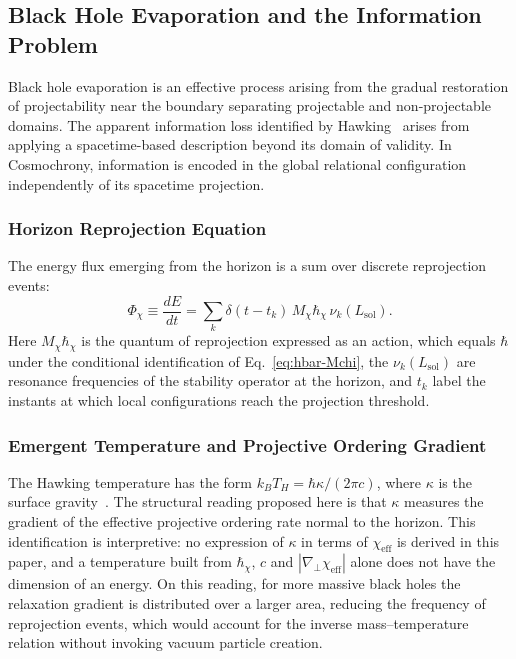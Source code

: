 \subsection{Black Hole Evaporation and the Information Problem}
  \label{subsec:black-hole-evaporation-information}

  Black hole evaporation is an effective process arising from the gradual
  restoration of projectability near the boundary separating projectable and
  non-projectable domains.
  The apparent information loss identified by
  Hawking~\cite{Hawking1976} arises from applying a spacetime-based
  description beyond its domain of validity.
  In Cosmochrony, information is encoded in the global relational
  configuration independently of its spacetime projection.

  \subsubsection*{Horizon Reprojection Equation}
    \label{subsec:horizon-reprojection-equation}

    The energy flux emerging from the horizon is a sum over discrete
    reprojection events:
    \[
      \Phi_\chi \equiv \frac{dE}{dt}
      = \sum_k \delta(t - t_k)\,
      M_\chi\hbar_\chi\, \nu_k(L_{\mathrm{sol}}).
    \]
    Here $M_\chi\hbar_\chi$ is the quantum of reprojection expressed as an action, which equals $\hbar$ under the
    conditional identification of Eq.~\eqref{eq:hbar-Mchi}, the
    $\nu_k(L_{\mathrm{sol}})$ are resonance frequencies of the stability
    operator at the horizon, and $t_k$ label the instants at which local
    configurations reach the projection threshold.

  \subsubsection*{Emergent Temperature and Projective Ordering Gradient}
    \label{subsec:emergent-temperature}

    The Hawking temperature has the form $k_B T_H = \hbar\kappa/(2\pi c)$, where $\kappa$ is the surface
    gravity~\cite{Hawking1975}.
    The structural reading proposed here is that $\kappa$ measures the gradient of the effective projective
    ordering rate normal to the horizon.
    This identification is interpretive: no expression of $\kappa$ in terms of $\chi_{\mathrm{eff}}$ is derived in this
    paper, and a temperature built from $\hbar_\chi$, $c$ and $|\nabla_\perp\chi_{\mathrm{eff}}|$ alone does not have
    the dimension of an energy.
    On this reading, for more massive black holes the relaxation gradient is distributed over
    a larger area, reducing the frequency of reprojection events, which would account for the inverse
    mass--temperature relation without invoking vacuum particle creation.

